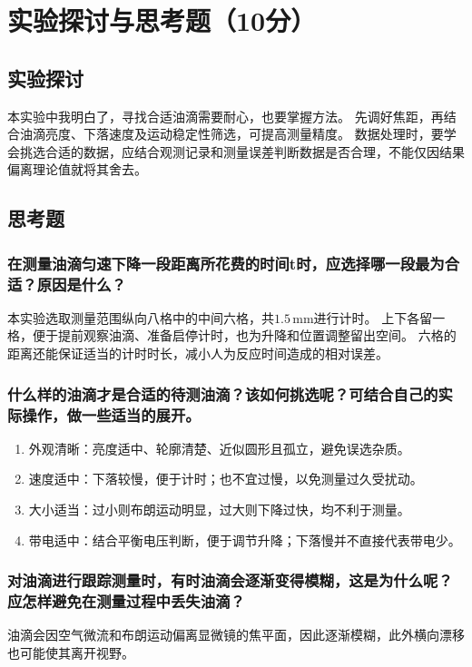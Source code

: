 \documentclass[10pt,a4paper]{ctexart} %
\begin{document}
\section{实验探讨与思考题（10分）}

  \subsection{实验探讨}
  本实验中我明白了，寻找合适油滴需要耐心，也要掌握方法。
  先调好焦距，再结合油滴亮度、下落速度及运动稳定性筛选，可提高测量精度。
  数据处理时，要学会挑选合适的数据，应结合观测记录和测量误差判断数据是否合理，不能仅因结果偏离理论值就将其舍去。

  \subsection{思考题}

    \subsubsection{在测量油滴匀速下降一段距离所花费的时间t时，应选择哪一段最为合适？原因是什么？}
    本实验选取测量范围纵向八格中的中间六格，共$1.5\,\mathrm{mm}$进行计时。
    上下各留一格，便于提前观察油滴、准备启停计时，也为升降和位置调整留出空间。
    六格的距离还能保证适当的计时时长，减小人为反应时间造成的相对误差。

    \subsubsection{什么样的油滴才是合适的待测油滴？该如何挑选呢？可结合自己的实际操作，做一些适当的展开。}
    \begin{enumerate}
      \item 外观清晰：亮度适中、轮廓清楚、近似圆形且孤立，避免误选杂质。
      \item 速度适中：下落较慢，便于计时；也不宜过慢，以免测量过久受扰动。
      \item 大小适当：过小则布朗运动明显，过大则下降过快，均不利于测量。
      \item 带电适中：结合平衡电压判断，便于调节升降；下落慢并不直接代表带电少。
    \end{enumerate}

    \subsubsection{对油滴进行跟踪测量时，有时油滴会逐渐变得模糊，这是为什么呢？应怎样避免在测量过程中丢失油滴？}
    油滴会因空气微流和布朗运动偏离显微镜的焦平面，因此逐渐模糊，此外横向漂移也可能使其离开视野。
    
\end{document}

